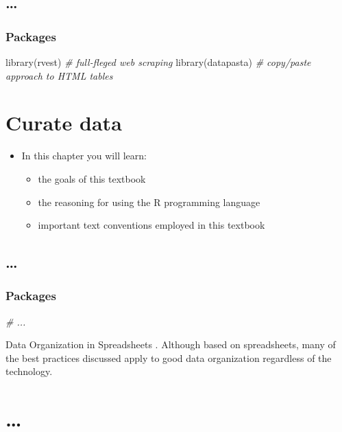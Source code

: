 \documentclass[
]{article}
\newenvironment{Shaded}{\begin{snugshade}}{\end{snugshade}}
\newcommand{\CommentTok}[1]{\textcolor[rgb]{0.56,0.35,0.01}{\textit{#1}}}
\newcommand{\FunctionTok}[1]{\textcolor[rgb]{0.00,0.00,0.00}{#1}}
\newcommand{\NormalTok}[1]{#1}
\providecommand{\tightlist}{%
  \setlength{\itemsep}{0pt}\setlength{\parskip}{0pt}}
\newenvironment{rmdblock}[1]
  {\begin{shaded*}
  \begin{itemize}
  \renewcommand{\labelitemi}{
    \raisebox{-.5\height}[0pt][0pt]{
      {\setkeys{Gin}{width=2em,keepaspectratio}\texttt{[image: assets/images/\#1]}}
    }
  }
  \item
  }
  {
  \end{itemize}
  \end{shaded*}
  }
\newenvironment{rmdkey}
  {\begin{rmdblock}{key}}
  {\end{rmdblock}}
\begin{document}
\hypertarget{section-4}{%
\subsection{\ldots{}}\label{section-4}}

\hypertarget{acquire-data-packages}{%
\subsubsection{Packages}\label{acquire-data-packages}}

\begin{Shaded}
\begin{Highlighting}[]
\FunctionTok{library}\NormalTok{(rvest) }\CommentTok{\# full{-}fleged web scraping}
\FunctionTok{library}\NormalTok{(datapasta) }\CommentTok{\# copy/paste approach to HTML tables}
\end{Highlighting}
\end{Shaded}

\hypertarget{curate-data}{%
\section{Curate data}\label{curate-data}}

\begin{rmdkey}
In this chapter you will learn:

\begin{itemize}
\tightlist
\item
  the goals of this textbook
\item
  the reasoning for using the R programming language
\item
  important text conventions employed in this textbook
\end{itemize}
\end{rmdkey}

\hypertarget{section-5}{%
\subsection{\ldots{}}\label{section-5}}

\hypertarget{curate-data-packages}{%
\subsubsection{Packages}\label{curate-data-packages}}

\begin{Shaded}
\begin{Highlighting}[]
\CommentTok{\# ...}
\end{Highlighting}
\end{Shaded}

Data Organization in Spreadsheets \citep{Broman2018}. Although based on spreadsheets, many of the best practices discussed apply to good data organization regardless of the technology.

\hypertarget{appendix-appendix}{%
\appendix}


\hypertarget{section-6}{%
\section{\ldots{}}\label{section-6}}

  
\end{document}
